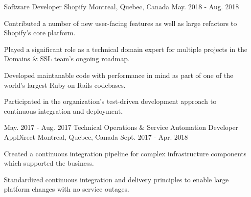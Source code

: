 

\begin{cventries}

  \cventry
  {\small Software Developer} %
  {\normalsize Shopify} %
  {\small Montreal, Quebec, Canada} %
  {\small May. 2018 - Aug. 2018} %
    {
      \begin{cvitems} %
      \item \small Contributed a number of new user-facing features as well as large refactors to Shopify's core platform.
      \item \small Played a significant role as a technical domain expert for multiple projects in the Domains \& SSL team's ongoing roadmap.
      \item \small Developed maintanable code with performance in mind as part of one of the world's largest Ruby on Rails codebases.
      \item \small Participated in the organization's test-driven development approach to continuous integration and deployment.
      \end{cvitems}
    }
\vspace{-18mm}
  \cventry
  {} %
  {} %
  {} %
  {\small May. 2017 - Aug. 2017 } %
    {
    }
\vspace{11mm}
  \cventry
  {\small Technical Operations \& Service Automation Developer} %
  {\normalsize AppDirect} %
  {\small Montreal, Quebec, Canada} %
  {\small Sept. 2017 - Apr. 2018 } %
    {
      \begin{cvitems} %
      \item \small Created a continuous integration pipeline for complex infrastructure components which supported the business.
      \item \small Standardized continuous integration and delivery principles to enable large platform changes with no service outages.

\end{cvitems}}
\end{cventries}
